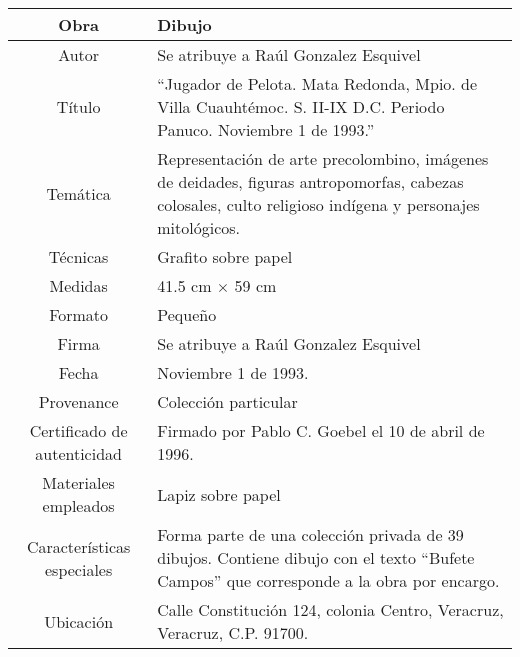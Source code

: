 \documentclass[10pt,letter]{report}
\begin{document}
\begin{table}[H]
\centering
\begin{tabular}{|c|m{}|}
\hline
Obra& Dibujo	\\
\hline
Autor & Se atribuye a Ra\'ul Gonzalez Esquivel\\
\hline
T\'itulo & ``Jugador de Pelota. Mata Redonda, Mpio. de Villa Cuauht\'emoc. S. II-IX D.C. Periodo Panuco. Noviembre 1 de 1993.''\\
\hline
Tem\'atica & Representaci\'on de arte precolombino, im\'agenes de deidades, figuras antropomorfas, cabezas colosales, culto religioso ind\'igena y personajes mitol\'ogicos.\\
\hline
T\'ecnicas &Grafito sobre papel \\
\hline
Medidas & 41.5 cm $\times$ 59 cm \\
\hline
 Formato & Peque\~no \\
 \hline
 Firma & Se atribuye a Ra\'ul Gonzalez Esquivel\\ 
 \hline
  Fecha & Noviembre 1 de 1993.\\
 \hline
 Provenance & Colecci\'on particular\\
 \hline
 Certificado de autenticidad& Firmado por Pablo C. Goebel el 10 de abril de 1996.  \\
 \hline 
  Materiales empleados & Lapiz sobre papel\\
 \hline
 Caracter\'isticas especiales & Forma parte de una colecci\'on privada de 39 dibujos. 
Contiene dibujo con el texto ``Bufete Campos'' que corresponde a la obra por encargo. \\
\hline 
Ubicaci\'on & Calle Constituci\'on 124, colonia Centro, Veracruz, Veracruz, C.P. 91700.\\
\hline

\end{tabular}
\end{table}
\end{document}
